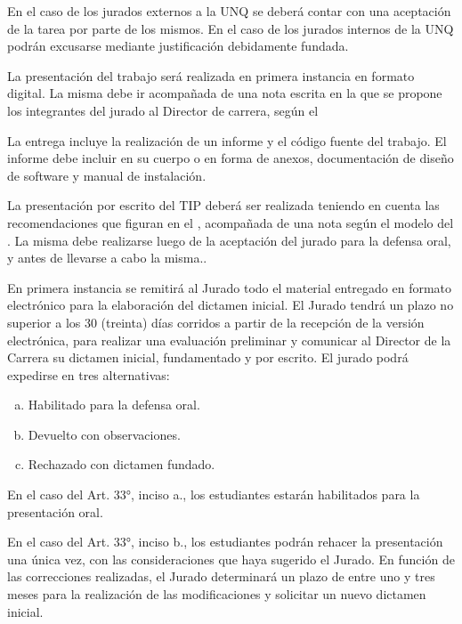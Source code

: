 \articulo En el caso de los jurados externos a la UNQ se deberá contar
con una aceptación de la tarea por parte de los mismos. En el caso de los jurados
internos de la UNQ podrán excusarse mediante justificación debidamente fundada. 


\articulo La presentación del trabajo será realizada en primera instancia en
formato digital. La misma debe ir acompañada de una nota escrita en la que se
propone los integrantes del jurado al Director de carrera, según el \anexoEntregaDigitalTIP

\articulo La entrega incluye la realización de un informe y el código fuente del
trabajo. El informe debe incluir en su cuerpo o en forma de anexos,
documentación de diseño de software y manual de instalación. 

\articulo La presentación por escrito del TIP deberá ser realizada teniendo
en cuenta las recomendaciones que figuran en el \anexoPresentacionInforme, acompañada de una nota
según el modelo del \anexoPresentacionInformeEscrito. La misma debe realizarse
luego de la aceptación del jurado para la defensa oral, y antes de llevarse a
cabo la misma..

\articulo En primera instancia se remitirá al Jurado todo el material entregado
en formato electrónico para la elaboración del dictamen inicial. El Jurado tendrá un
plazo no superior a los 30 (treinta) días corridos a partir de la recepción de la versión
electrónica, para realizar una evaluación preliminar y comunicar al Director de la
Carrera su dictamen inicial, fundamentado y por escrito. El jurado podrá expedirse en
tres alternativas:

\begin{enumerate}[a.]
\item Habilitado para la defensa oral.
\item Devuelto con observaciones.
\item Rechazado con dictamen fundado.
\end{enumerate}

\articulo En el caso del Art. 33°, inciso a., los estudiantes estarán
habilitados para la presentación oral. 

\articulo En el caso del Art. 33°, inciso b., los estudiantes podrán rehacer
la presentación una única vez, con las consideraciones que haya sugerido el Jurado.
En función de las correcciones realizadas, el Jurado determinará un plazo de entre
uno y tres meses para la realización de las modificaciones y solicitar un nuevo
dictamen inicial.

